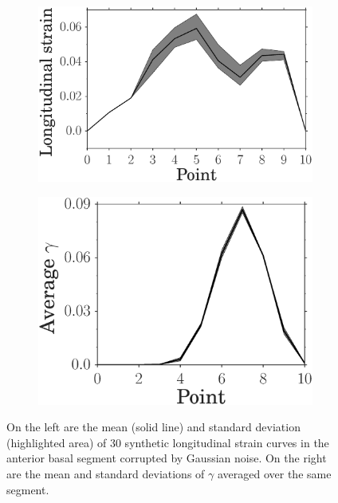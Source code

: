 \begin{figure}[htbp]
  \begin{subfigure}[t]{0.5\textwidth}
    \includegraphics[width=\textwidth]{noisy_strain_region_1_ground.eps}
  \end{subfigure}
  \begin{subfigure}[t]{0.41\textwidth}
    \includegraphics[width=\textwidth]{mean_gamma_region_1_synth_w_noise.eps}
  \end{subfigure}
\caption{
On the left are the mean (solid line) and standard deviation (highlighted area) of 30
synthetic longitudinal strain curves in the anterior basal segment corrupted by Gaussian noise.
On the right are the mean and standard deviations of
$\gamma$ averaged over the same segment.}
\label{fig:noisy_strain_curve}
\end{figure}



